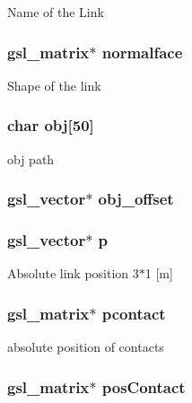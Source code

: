 Name of the Link \hypertarget{struct_stu_l_i_n_k_a0f61fb37e521836d2d8734e528d3f1ee}{
\subsubsection[{normalface}]{\setlength{\rightskip}{0pt plus 5cm}gsl\-\_\-matrix$\ast$ normalface}}\label{struct_stu_l_i_n_k_a0f61fb37e521836d2d8734e528d3f1ee}
Shape of the link \hypertarget{struct_stu_l_i_n_k_ae779e94b90b30c0e3bf144feba6ee036}{
\subsubsection[{obj}]{\setlength{\rightskip}{0pt plus 5cm}char obj\mbox{[}50\mbox{]}}}\label{struct_stu_l_i_n_k_ae779e94b90b30c0e3bf144feba6ee036}
obj path \hypertarget{struct_stu_l_i_n_k_a30ce35c26cd46c26cd83a0de1cfce268}{
\subsubsection[{obj\-\_\-offset}]{\setlength{\rightskip}{0pt plus 5cm}gsl\-\_\-vector$\ast$ obj\-\_\-offset}}\label{struct_stu_l_i_n_k_a30ce35c26cd46c26cd83a0de1cfce268}
\hypertarget{struct_stu_l_i_n_k_a1fca5e9ed2cedc33aeffbd49a3a8b129}{
\subsubsection[{p}]{\setlength{\rightskip}{0pt plus 5cm}gsl\-\_\-vector$\ast$ p}}\label{struct_stu_l_i_n_k_a1fca5e9ed2cedc33aeffbd49a3a8b129}
Absolute link position 3$\ast$1 \mbox{[}m\mbox{]} \hypertarget{struct_stu_l_i_n_k_ac24419f76664edd80380489bd16d312f}{
\subsubsection[{pcontact}]{\setlength{\rightskip}{0pt plus 5cm}gsl\-\_\-matrix$\ast$ pcontact}}\label{struct_stu_l_i_n_k_ac24419f76664edd80380489bd16d312f}
absolute position of contacts \hypertarget{struct_stu_l_i_n_k_af57173afe5aaff2961e6c34caf25d722}{
\subsubsection[{pos\-Contact}]{\setlength{\rightskip}{0pt plus 5cm}gsl\-\_\-matrix$\ast$ pos\-Contact}}\label{struct_stu_l_i_n_k_af57173afe5aaff2961e6c34caf25d722}
